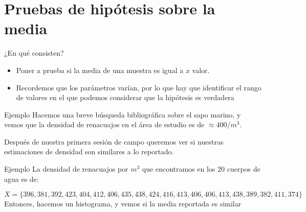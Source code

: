 \documentclass[
  11pt,
  ignorenonframetext,
]{beamer}
\begin{document}
\hypertarget{pruebas-de-hipuxf3tesis-sobre-la-media}{%
\section{Pruebas de hipótesis sobre la
media}\label{pruebas-de-hipuxf3tesis-sobre-la-media}}

\begin{frame}{¿En qué consisten?}
\protect\hypertarget{en-quuxe9-consisten}{}
\begin{itemize}
\item
  Poner a prueba si la media de una muestra es igual a \(x\) valor.
\item
  Recordemos que los parámetros varían, por lo que hay que identificar
  el rango de valores en el que podemos considerar que la hipótesis es
  verdadera
\end{itemize}
\end{frame}

\begin{frame}{Ejemplo}
\protect\hypertarget{ejemplo-2}{}
Hacemos una breve búsqueda bibliográfica sobre el sapo marino, y vemos
que la densidad de renacuajos en el área de estudio es de
\(\approx 400 / m^3\).

Después de nuestra primera sesión de campo queremos ver si nuestras
estimaciones de densidad son similares a lo reportado.
\end{frame}

\begin{frame}{Ejemplo}
\protect\hypertarget{ejemplo-3}{}
La densidad de renacuajos por \(m^3\) que encontramos en los 20 cuerpos
de agua es de:

\[X = \{ 396, 381, 392, 423, 404, 412, 406, 435, 438, 424, 416, 413, 406, 406, 413, 438, 389, 382, 411, 374 \}\]
Entonces, hacemos un histograma, y vemos si la media reportada es
similar
\end{frame}
\end{document}
